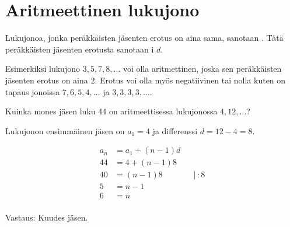 \section{Aritmeettinen lukujono}

Lukujonoa, jonka peräkkäisten jäsenten erotus on aina sama, sanotaan . Tätä peräkkäisten jäsenten erotusta sanotaan i $d$.



Esimerkiksi lukujono $3, 5, 7, 8, \ldots$ voi olla aritmettinen, joska sen peräkkäisten jäsenten erotus on aina 2. Erotus voi olla myös negatiivinen tai nolla kuten on tapaus jonoissa  $7, 6, 5, 4, \ldots$ ja  $3, 3, 3, 3, \ldots$.

\begin{esimerkki}

Kuinka mones jäsen luku 44 on aritmeettisessa lukujonossa $4, 12,  \ldots$?

Lukujonon ensimmäinen jäsen on $a_1=4$ ja differenssi $d=12-4=8$.

\begin{align*}
	a_n &= a_1+(n-1)d  \\
	44 &= 4 +(n-1)8  \\
	40 &= (n-1)8 & & | \, :8 \\
	5 &= n-1 \\
	6 &= n\\
\end{align*}

Vastaus: Kuudes jäsen.

\end{esimerkki}